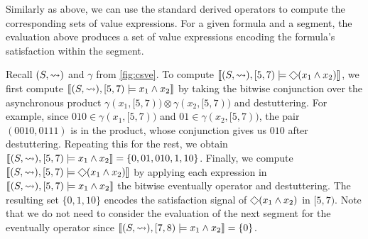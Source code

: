 Similarly as above, we can use the standard derived operators to compute the corresponding sets of value expressions.
For a given formula and a segment, the evaluation above produces a set of value expressions encoding the formula's satisfaction within the segment.

\vspace{-0.5em}
\begin{example}
	Recall $(S, {\rightsquigarrow})$ and $\gamma$ from \cref{fig:csve}.
	To compute $\llbracket (S, {\hb}), [5,7) \models \LTLeventually(x_1 \land x_2) \rrbracket$, we first compute $\llbracket (S, {\rightsquigarrow}), [5,7) \models x_1 \land x_2 \rrbracket$ by taking the bitwise conjunction over the asynchronous product $\gamma(x_1, [5,7)) \otimes \gamma(x_2, [5,7))$ and destuttering.
	For example, since $010 \in \gamma(x_1, [5,7))$ and $01 \in \gamma(x_2, [5,7))$, the pair $(0010,0111)$ is in the product, whose conjunction gives us $010$ after destuttering. 
	Repeating this for the rest, we obtain $\llbracket (S, {\rightsquigarrow}), [5,7) \models x_1 \land x_2 \rrbracket = \{ 0, 01, 010, 1, 10 \}$.
	Finally, we compute $\llbracket (S, {\hb}), [5,7) \models \LTLeventually(x_1 \land x_2) \rrbracket$ by applying each expression in $\llbracket (S, {\rightsquigarrow}), [5,7) \models x_1 \land x_2 \rrbracket$ the bitwise eventually operator and destuttering.
	The resulting set $\{0, 1, 10\}$ encodes the satisfaction signal of $\LTLeventually(x_1 \land x_2)$ in $[5,7)$.
	Note that we do not need to consider the evaluation of the next segment for the eventually operator since $\llbracket (S, {\rightsquigarrow}), [7,8) \models x_1 \land x_2 \rrbracket = \{0\}$.
\end{example}

\vspace{-0.7em}
